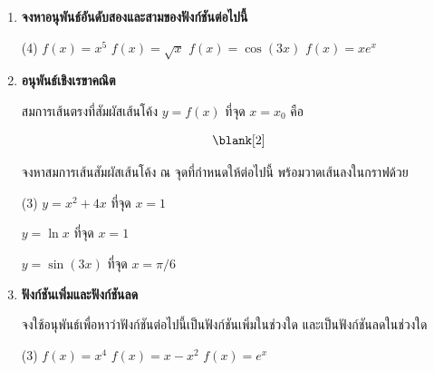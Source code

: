 \begin{enumerate}

\item \textbf{จงหาอนุพันธ์อันดับสองและสามของฟังก์ชันต่อไปนี้}
\begin{tasks}[after-skip = 100pt](4)
\task $f(x)=x^5$
\task $f(x) = \sqrt{x}$
\task $f(x) = \cos(3x)$
\task $f(x) = xe^x$
\end{tasks}

\item \textbf{อนุพันธ์เชิงเรขาคณิต}

สมการเส้นตรงที่สัมผัสเส้นโค้ง $y=f(x)$ ที่จุด $x=x_0$ คือ

\[ \blank[2] \]

จงหาสมการเส้นสัมผัสเส้นโค้ง ณ จุดที่กำหนดให้ต่อไปนี้ พร้อมวาดเส้นลงในกราฟด้วย

\begin{tasks}[after-skip = 120pt](3)
\task $y = x^2+4x$ ที่จุด $x = 1$


\task $y = \ln x$ ที่จุด $x=1$


\task $y = \sin (3x)$ ที่จุด $x = \pi/6$

\end{tasks}

\item \textbf{ฟังก์ชันเพิ่มและฟังก์ชันลด}

จงใช้อนุพันธ์เพื่อหาว่าฟังก์ชันต่อไปนี้เป็นฟังก์ชันเพิ่มในช่วงใด และเป็นฟังก์ชันลดในช่วงใด
\begin{tasks}[after-skip = 60pt](3)
\task $f(x)=x^4$
\task $f(x)=x-x^2$
\task $f(x)=e^x$
\end{tasks}

\newpage


\end{enumerate}
